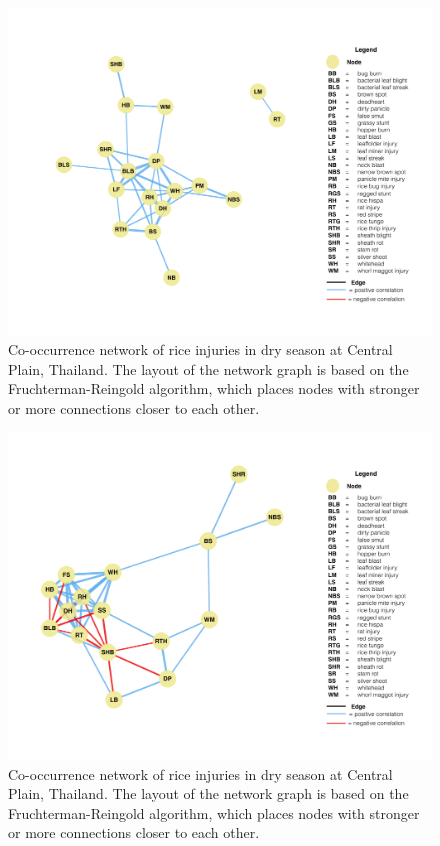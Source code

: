 \begin{figure}
    \centering
        \includegraphics[width = 1\textwidth]{figures/fullnetwork_RRws.pdf}
        \caption{Co-occurrence network of rice injuries in dry season at Central Plain, Thailand. The layout of the network graph is based on the Fruchterman-Reingold algorithm, which places nodes with stronger or more connections closer to each other.}
        \label{fig:fullnetwork_RRws}
    \end{figure}
\begin{figure}
    \centering
        \includegraphics[width = 1\textwidth]{figures/fullnetwork_TMds.pdf}
        \caption{Co-occurrence network of rice injuries in dry season at Central Plain, Thailand. The layout of the network graph is based on the Fruchterman-Reingold algorithm, which places nodes with stronger or more connections closer to each other.}
        \label{fig:fullnetwork_TMds}
    \end{figure}


